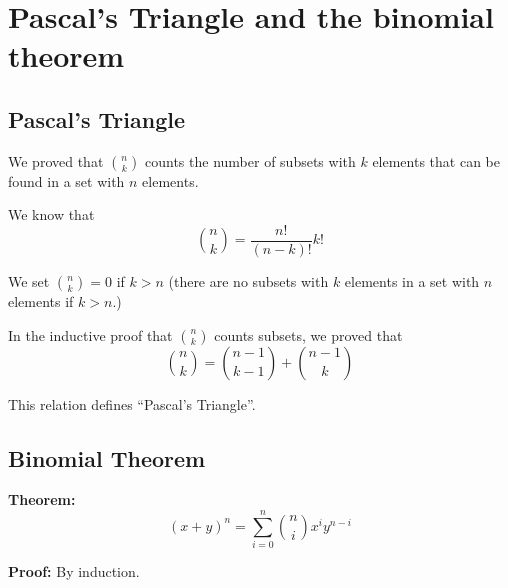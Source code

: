 \documentclass[
]{article}
\author{}
\date{}
\begin{document}
\hypertarget{pascals-triangle-and-the-binomial-theorem}{%
\section{Pascal's Triangle and the binomial
theorem}\label{pascals-triangle-and-the-binomial-theorem}}

\hypertarget{pascals-triangle}{%
\subsection{Pascal's Triangle}\label{pascals-triangle}}

We proved that \(\binom{n}{k}\) counts the number of subsets with \(k\)
elements that can be found in a set with \(n\) elements.

We know that \[
\binom{n}{k} = \frac{n!}{(n-k)!}{k!}
\]

We set \(\binom{n}{k}=0\) if \(k>n\) (there are no subsets with \(k\)
elements in a set with \(n\) elements if \(k>n\).)

In the inductive proof that \(\binom{n}{k}\) counts subsets, we proved
that \[
\binom{n}{k} = \binom{n-1}{k-1} + \binom{n-1}{k}
\]

This relation defines ``Pascal's Triangle''. \vfill\eject

\hypertarget{binomial-theorem}{%
\subsection{Binomial Theorem}\label{binomial-theorem}}

\textbf{Theorem:} \[
(x+y)^{n} = \sum_{i=0}^{n} \binom{n}{i}x^i y^{n-i}
\]

\textbf{Proof:} By induction.
\end{document}
